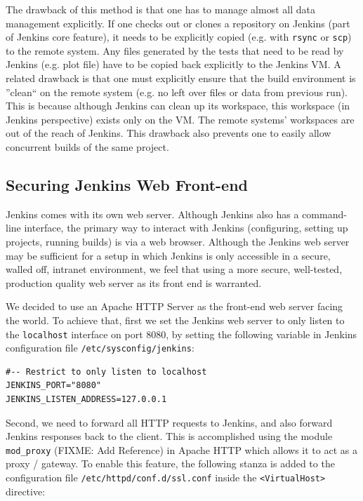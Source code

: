 \documentclass[10pt, conference, compsocconf]{IEEEtran}
\begin{document}
The drawback of this method is that one has to manage almost all data management explicitly. 
If one checks out or clones a repository on Jenkins (part of Jenkins core feature), it needs to be explicitly copied (e.g. with \texttt{rsync} or \texttt{scp}) to the remote system. 
Any files generated by the tests that need to be read by Jenkins (e.g. plot file) have to be copied back explicitly to the Jenkins VM. 
A related drawback is that one must explicitly ensure that the build environment is ''clean`` on the remote system (e.g. no left over files or data from previous run). 
This is because although Jenkins can clean up its workspace, this workspace (in Jenkins perspective) exists only on the VM. 
The remote systems' workspaces are out of the reach of Jenkins. 
This drawback also prevents one to easily allow concurrent builds of the same project. 



\subsection{Securing Jenkins Web Front-end}

Jenkins comes with its own web server. 
Although Jenkins also has a command-line interface, the primary way to interact with Jenkins (configuring, setting up projects, running builds) is via a web browser. 
Although the Jenkins web server may be sufficient for a setup in which Jenkins is only accessible in a secure, walled off, intranet environment, we feel that using a more secure, well-tested, production quality web server as its front end is warranted.

We decided to use an Apache HTTP Server as the front-end web server facing the world. 
To achieve that, first we set the Jenkins web server to only listen to the \texttt{localhost} interface on port 8080, by setting the following variable in Jenkins configuration file \texttt{/etc/sysconfig/jenkins}:
\begin{lstlisting}
#-- Restrict to only listen to localhost
JENKINS_PORT="8080"
JENKINS_LISTEN_ADDRESS=127.0.0.1
\end{lstlisting}

Second, we need to forward all HTTP requests to Jenkins, and also forward Jenkins responses back to the client. 
This is accomplished using the module \texttt{mod_proxy} (FIXME: Add Reference) in Apache HTTP which allows it to act as a proxy / gateway. 
To enable this feature, the following stanza is added to the configuration file \texttt{/etc/httpd/conf.d/ssl.conf} inside the \texttt{<VirtualHost>} directive:
\end{document}
